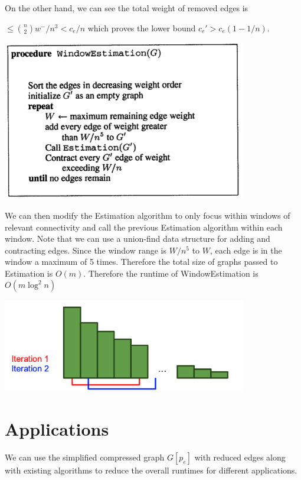 \documentclass[11pt]{article}
\begin{document}
On the other hand, we can see the total weight of removed edges is 

$\le {n \choose 2} w^- / n^3 < c_e/n$ 
which proves the lower bound $c_e' > c_e(1 - 1/n)$.

\begin{center}
\includegraphics[width=0.8\textwidth]{figures/WindowEstimation.png}
\end{center}

We can then modify the Estimation algorithm to only focus within windows of relevant connectivity and call the previous Estimation algorithm within each window. Note that we can use a union-find data structure for adding and contracting edges. Since the window range is $W/n^5$ to $W$, each edge is in the window a maximum of 5 times. Therefore the total size of graphs passed to Estimation is $O(m)$. Therefore the runtime of WindowEstimation is $O(m\log^2 n)$

\begin{center}
\includegraphics[width=0.8\textwidth]{figures/window.png}
\end{center}



\section{Applications}

We can use the simplified compressed graph $G[p_e]$ with reduced edges along with existing algorithms to reduce the overall runtimes for different applications.
\end{document}

